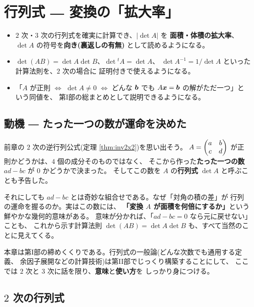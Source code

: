 \chapter{行列式 ― 変換の「拡大率」}\label{chap:det}

\begin{goal}
\begin{itemize}
\item $2$ 次・$3$ 次の行列式を確実に計算でき、$|\det A|$ を
\textbf{面積・体積の拡大率}、$\det A$ の符号を\textbf{向き(裏返しの有無)}
として読めるようになる。
\item $\det(AB) = \det A \det B$、$\det {}^t\!A = \det A$、
$\det A^{-1} = 1/\det A$ といった計算法則を、$2$ 次の場合に
証明付きで使えるようになる。
\item 「$A$ が正則 $\iff$ $\det A \neq 0$ $\iff$ どんな $\bm{b}$ でも
$A\bm{x} = \bm{b}$ の解がただ一つ」という同値を、
第I部の総まとめとして説明できるようになる。
\end{itemize}
\end{goal}

\section{動機 ― たった一つの数が運命を決めた}

前章の $2$ 次の逆行列公式(定理 \ref{thm:inv2x2})を思い出そう。
$A = \begin{pmatrix}a & b \\ c & d\end{pmatrix}$ が正則かどうかは、$4$ 個の成分そのものではなく、
そこから作った\textbf{たった一つの数} $ad - bc$ が $0$ かどうかで決まった。
そしてこの数を $A$ の\textbf{行列式} $\det A$ と呼ぶことも予告した。

それにしても $ad - bc$ とは奇妙な組合せである。なぜ「対角の積の差」が
行列の運命を握るのか。実はこの数には、
\textbf{「変換 $A$ が面積を何倍にするか」}という鮮やかな幾何的意味がある。
意味が分かれば、「$ad - bc = 0$ なら元に戻せない」ことも、
これから示す計算法則 $\det(AB) = \det A \det B$ も、すべて当然のことに見えてくる。

本章は第I部の締めくくりである。行列式の一般論(どんな次数でも通用する定義、
余因子展開などの計算技術)は第II部でじっくり構築することにして、
ここでは $2$ 次と $3$ 次に話を限り、\textbf{意味}と\textbf{使い方}を
しっかり身につける。

\section{$2$ 次の行列式}

